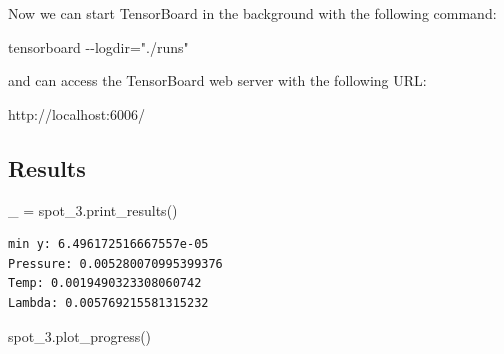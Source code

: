 \documentclass[
  letterpaper,
  DIV=11,
  numbers=noendperiod]{scrreprt}
\newenvironment{Shaded}{\begin{snugshade}}{\end{snugshade}}
\newcommand{\NormalTok}[1]{\textcolor[rgb]{0.00,0.23,0.31}{#1}}
\newcommand{\OperatorTok}[1]{\textcolor[rgb]{0.37,0.37,0.37}{#1}}
\begin{document}
\begin{tcolorbox}[enhanced jigsaw, rightrule=.15mm, coltitle=black, title=\textcolor{quarto-callout-note-color}{\faInfo}\hspace{0.5em}{Note}, opacitybacktitle=0.6, bottomrule=.15mm, opacityback=0, left=2mm, colback=white, leftrule=.75mm, colframe=quarto-callout-note-color-frame, colbacktitle=quarto-callout-note-color!10!white, toprule=.15mm, toptitle=1mm, bottomtitle=1mm, titlerule=0mm, breakable, arc=.35mm]

Now we can start TensorBoard in the background with the following
command:

\begin{Shaded}
\begin{Highlighting}[]
\NormalTok{tensorboard {-}{-}logdir="./runs"}
\end{Highlighting}
\end{Shaded}

and can access the TensorBoard web server with the following URL:

\begin{Shaded}
\begin{Highlighting}[]
\NormalTok{http://localhost:6006/}
\end{Highlighting}
\end{Shaded}

\end{tcolorbox}

\subsection{Results}\label{results}

\begin{Shaded}
\begin{Highlighting}[]
\NormalTok{\_ }\OperatorTok{=}\NormalTok{ spot\_3.print\_results()}
\end{Highlighting}
\end{Shaded}

\begin{verbatim}
min y: 6.496172516667557e-05
Pressure: 0.005280070995399376
Temp: 0.0019490323308060742
Lambda: 0.005769215581315232
\end{verbatim}

\begin{Shaded}
\begin{Highlighting}[]
\NormalTok{spot\_3.plot\_progress()}
\end{Highlighting}
\end{Shaded}
\end{document}
